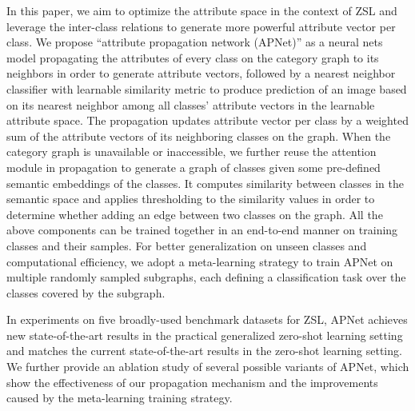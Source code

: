 \documentclass[letterpaper]{article}
\begin{document}
In this paper, we aim to optimize the attribute space in the context of ZSL and leverage the inter-class relations to generate more powerful attribute vector per  class. We propose ``attribute propagation network (APNet)'' as a neural nets model propagating the attributes of every class on the category graph to its neighbors in order to generate attribute vectors, followed by a nearest neighbor classifier with learnable similarity metric to produce prediction of an image based on its nearest neighbor among all classes' attribute vectors in the learnable attribute space. The propagation updates attribute vector per class by a weighted sum of the attribute vectors of its neighboring classes on the graph.
When the category graph is unavailable or inaccessible, we further reuse the attention module in propagation to generate a graph of classes given some pre-defined semantic embeddings of the classes. It computes similarity between classes in the semantic space and applies  thresholding to the similarity values in order to determine whether adding an edge between two classes on the graph.
All the above components can be trained together in an end-to-end manner on training classes and their samples.
For better generalization on unseen classes and computational efficiency,
we adopt a meta-learning strategy to train APNet on multiple randomly sampled subgraphs, each defining a classification task over the classes covered by the subgraph.


In experiments on five broadly-used benchmark datasets for ZSL, APNet achieves new state-of-the-art results in the practical generalized zero-shot learning setting and matches the current state-of-the-art results in the zero-shot learning setting.
We further provide an ablation study of several possible variants of APNet, which show the effectiveness of our propagation mechanism and the improvements caused by the meta-learning training strategy.
\end{document}
